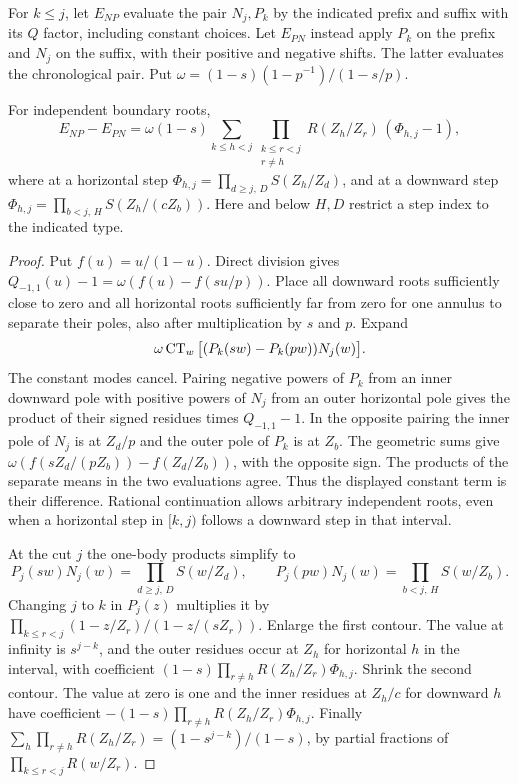 For $k\le j$, let $E_{NP}$ evaluate the pair $N_j,P_k$ by the indicated
prefix and suffix with its $Q$ factor, including constant choices.
Let $E_{PN}$ instead apply $P_k$ on the prefix and $N_j$ on the suffix,
with their positive and negative shifts. The latter evaluates the
chronological pair. Put $\omega=(1-s)(1-p^{-1})/(1-s/p)$.
\begin{lemma}\label{lem:quadraticinterchange}
For independent boundary roots,
\begin{equation}\label{eq:qmiddle}
 E_{NP}-E_{PN}=
 \omega(1-s)\sum_{k\le h<j}
 \prod_{\substack{k\le r<j\\r\ne h}}R(Z_h/Z_r)\,(\Phi_{h,j}-1),
\end{equation}
where at a horizontal step $\Phi_{h,j}=\prod_{d\ge j,\,D}S(Z_h/Z_d)$,
and at a downward step $\Phi_{h,j}=\prod_{b<j,\,H}S(Z_h/(cZ_b))$.
Here and below $H,D$ restrict a step index to the indicated type.
\end{lemma}
\begin{proof}
Put $f(u)=u/(1-u)$. Direct division gives
$Q_{-1,1}(u)-1=\omega(f(u)-f(su/p))$.
Place all downward roots sufficiently close to zero and all horizontal
roots sufficiently far from zero for one annulus to separate their poles,
also after multiplication by $s$ and $p$. Expand
\[
       \omega\operatorname{CT}_w\big[(P_k(sw)-P_k(pw))N_j(w)\big].
\]
The constant modes cancel. Pairing negative powers of $P_k$ from an inner
downward pole with positive powers of $N_j$ from an outer horizontal
pole gives the product of their signed residues times $Q_{-1,1}-1$.
In the opposite pairing the inner pole of $N_j$ is at $Z_d/p$ and the
outer pole of $P_k$ is at $Z_b$. The geometric sums give
$\omega(f(sZ_d/(pZ_b))-f(Z_d/Z_b))$, with the opposite sign.
The products of the separate means in the two evaluations agree. Thus
the displayed constant term is their difference. Rational continuation
allows arbitrary independent roots, even when a horizontal step in
$[k,j)$ follows a downward step in that interval.

At the cut $j$ the one-body products simplify to
\[
 P_j(sw)N_j(w)=\prod_{d\ge j,\,D}S(w/Z_d),\qquad
 P_j(pw)N_j(w)=\prod_{b<j,\,H}S(w/Z_b).
\]
Changing $j$ to $k$ in $P_j(z)$ multiplies it by
$\prod_{k\le r<j}(1-z/Z_r)/(1-z/(sZ_r))$.
Enlarge the first contour. The value at infinity is $s^{j-k}$, and
the outer residues occur at $Z_h$ for horizontal $h$ in the interval,
with coefficient $(1-s)\prod_{r\ne h}R(Z_h/Z_r)\Phi_{h,j}$.
Shrink the second contour. The value at zero is one and the inner
residues at $Z_h/c$ for downward $h$ have coefficient
$-(1-s)\prod_{r\ne h}R(Z_h/Z_r)\Phi_{h,j}$.
Finally $\sum_h\prod_{r\ne h}R(Z_h/Z_r)=(1-s^{j-k})/(1-s)$,
by partial fractions of $\prod_{k\le r<j}R(w/Z_r)$.
\end{proof}

